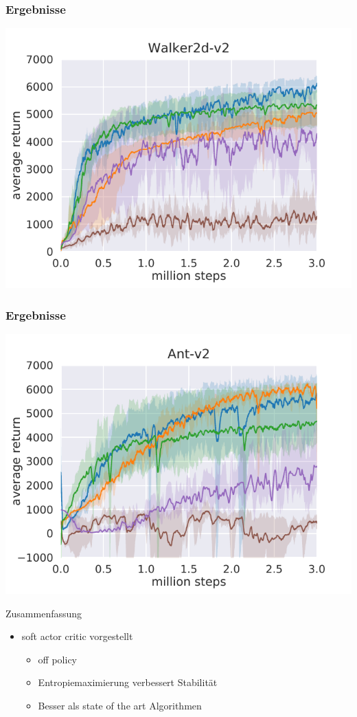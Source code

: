 \begin{frame}
    \frametitle{Ergebnisse}
    \includegraphics[scale=0.8]{figures/walker.pdf}
\end{frame}

\begin{frame}
    \frametitle{Ergebnisse}
    \includegraphics[scale=0.8]{figures/ant.pdf}
\end{frame}


\begin{frame}{Zusammenfassung}
        \begin{itemize}
            \item soft actor critic vorgestellt
            \begin{itemize}
                \item off policy
                \item Entropiemaximierung verbessert Stabilität
                \item Besser als state of the art Algorithmen 
            \end{itemize} 
        \end{itemize}
\end{frame}


